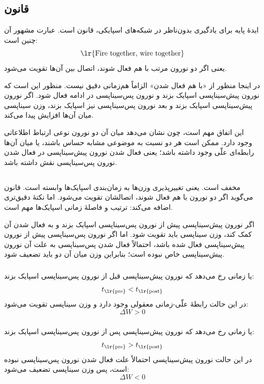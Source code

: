 \subsection{قانون }
ایدهٔ پایه برای یادگیری بدون‌ناظر در شبکه‌های اسپایکی، قانون  است. عبارت مشهور آن چنین است:
\[
\text{\lr{Fire together, wire together}}
\]
یعنی اگر دو نورون مرتب با هم فعال شوند، اتصال بین آن‌ها تقویت می‌شود.

در اینجا منظور از «با هم فعال شدن» الزاماً هم‌زمانی دقیق نیست. منظور این است که نورون پیش‌سیناپسی اسپایک بزند و نورون پس‌سیناپسی در ادامه فعال شود. اگر نورون پیش‌سیناپسی اسپایک بزند و بعد نورون پس‌سیناپسی نیز اسپایک بزند، وزن سیناپسی میان آن‌ها افزایش پیدا می‌کند.

این اتفاق مهم است، چون نشان می‌دهد میان آن دو نورون نوعی ارتباط اطلاعاتی وجود دارد. ممکن است هر دو نسبت به موضوعی مشابه حساس باشند، یا میان آن‌ها رابطه‌ای علّی وجود داشته باشد؛ یعنی فعال شدن نورون پیش‌سیناپسی در فعال شدن نورون پس‌سیناپسی نقش داشته باشد.

\subsection{}
 مخفف  است. یعنی تغییرپذیری وزن‌ها به زمان‌بندی اسپایک‌ها وابسته است. قانون  می‌گوید اگر دو نورون با هم فعال شوند، اتصالشان تقویت می‌شود. اما  نکتهٔ دقیق‌تری اضافه می‌کند: ترتیب و فاصلهٔ زمانی اسپایک‌ها مهم است.

اگر نورون پیش‌سیناپسی پیش از نورون پس‌سیناپسی اسپایک بزند و به فعال شدن آن کمک کند، وزن سیناپسی باید تقویت شود. اما اگر نورون پس‌سیناپسی پیش از نورون پیش‌سیناپسی فعال شده باشد، احتمالاً فعال شدن پس‌سیناپسی به علت آن نورون پیش‌سیناپسی خاص نبوده است؛ بنابراین وزن میان آن دو باید تضعیف شود.

\subsubsection{}
 یا  زمانی رخ می‌دهد که نورون پیش‌سیناپسی قبل از نورون پس‌سیناپسی اسپایک بزند:
\[
t_{\text{\lr{pre}}} < t_{\text{\lr{post}}}
\]
در این حالت رابطهٔ علّی-زمانی معقولی وجود دارد و وزن سیناپسی تقویت می‌شود:
\[
\Delta W > 0
\]

\subsubsection{}
 یا  زمانی رخ می‌دهد که نورون پیش‌سیناپسی پس از نورون پس‌سیناپسی اسپایک بزند:
\[
t_{\text{\lr{pre}}} > t_{\text{\lr{post}}}
\]
در این حالت نورون پیش‌سیناپسی احتمالاً علت فعال شدن نورون پس‌سیناپسی نبوده است، پس وزن سیناپسی تضعیف می‌شود:
\[
\Delta W < 0
\]

